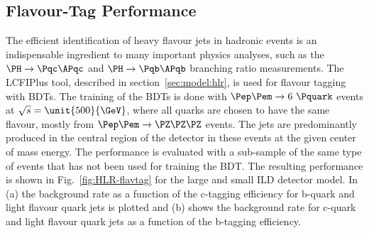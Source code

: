 \subsection{Flavour-Tag Performance}
\label{sec:perf:hlr:lcfi}
The efficient identification of heavy flavour jets in hadronic events is an indispensable ingredient to many important physics analyses, such as
the $\PH\rightarrow\Pqc\APqc$ and $\PH\rightarrow\Pqb\APqb$ branching ratio  measurements.
The LCFIPlus tool, described in section~\ref{sec:model:hlr}, is used for flavour tagging with BDTs. The training of the BDTs is done with
$\Pep \Pem \rightarrow 6~\Pquark$ events at $\sqrt{s}=\unit{500}{\GeV}$, where all quarks are chosen to have the same flavour, mostly
from $\Pep \Pem \rightarrow \PZ\PZ\PZ$ events. The jets are predominantly produced in the central region of the detector in these events at the given center of mass energy.
The performance is evaluated with a sub-sample of the same type of events that has not been used for training the BDT.
The resulting performance is shown in Fig.~\ref{fig:HLR-flavtag} for the large and small ILD detector model.
In (a) the background rate as a function of the c-tagging efficiency for b-quark and light flavour quark jets is plotted and (b) shows the
 background rate for c-quark and light flavour quark jets as a function of the b-tagging efficiency.
%
